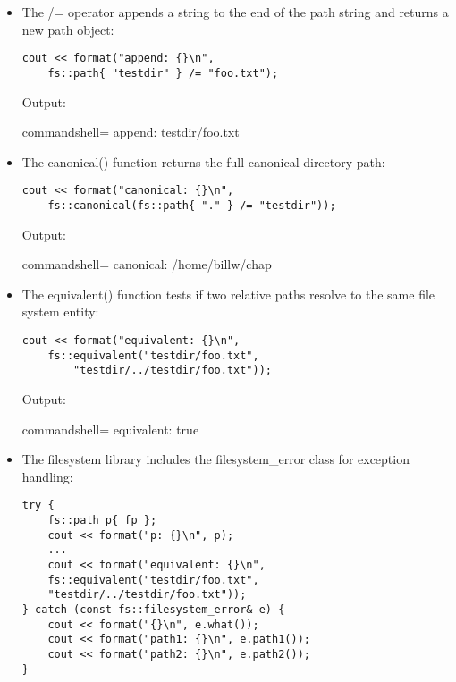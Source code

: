 \begin{itemize}
\item 
The /= operator appends a string to the end of the path string and returns a new path object:

\begin{lstlisting}[style=styleCXX]
cout << format("append: {}\n",
	fs::path{ "testdir" } /= "foo.txt");
\end{lstlisting}

Output:

\begin{tcblisting}{commandshell={}}
append: testdir/foo.txt
\end{tcblisting}

\item 
The canonical() function returns the full canonical directory path:

\begin{lstlisting}[style=styleCXX]
cout << format("canonical: {}\n",
	fs::canonical(fs::path{ "." } /= "testdir"));
\end{lstlisting}

Output:

\begin{tcblisting}{commandshell={}}
canonical: /home/billw/chap
\end{tcblisting}

\item 
The equivalent() function tests if two relative paths resolve to the same file system entity:

\begin{lstlisting}[style=styleCXX]
cout << format("equivalent: {}\n",
	fs::equivalent("testdir/foo.txt",
		"testdir/../testdir/foo.txt"));
\end{lstlisting}

Output:

\begin{tcblisting}{commandshell={}}
equivalent: true
\end{tcblisting}

\item 
The filesystem library includes the filesystem\_error class for exception handling:

\begin{lstlisting}[style=styleCXX]
try {
	fs::path p{ fp };
	cout << format("p: {}\n", p);
	...
	cout << format("equivalent: {}\n",
	fs::equivalent("testdir/foo.txt",
	"testdir/../testdir/foo.txt"));
} catch (const fs::filesystem_error& e) {
	cout << format("{}\n", e.what());
	cout << format("path1: {}\n", e.path1());
	cout << format("path2: {}\n", e.path2());
}
\end{lstlisting}


\end{itemize}
